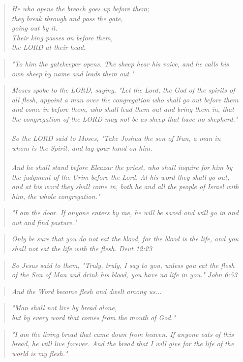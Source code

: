 \documentclass[10pt,oneside,footinclude=true,headinclude=true]{scrbook} %
\newcommand\quot[1]{
	\begin{quote}\textit{\small#1}\end{quote}
}
\begin{document}
\quot{He who opens the breach goes up before them;\\
\hspace*{5mm}they break through and pass the gate,\\
\hspace*{5mm}going out by it.\\
Their king passes on before them,\\
\hspace*{5mm}the LORD at their head.}

\quot{"To him the gatekeeper opens. The sheep hear his voice, and he calls his own sheep by name and leads them out."}

\quot{Moses spoke to the LORD, saying, "Let the Lord, the God of the spirits of all flesh, appoint a man over the congregation who shall go out before them and come in before them, who shall lead them out and bring them in, that the congregation of the LORD may not be as sheep that have no shepherd."\\
\\
So the LORD said to Moses, "Take Joshua the son of Nun, a man in whom is the Spirit, and lay your hand on him.\\
\\
And he shall stand before Eleazar the priest, who shall inquire for him by the judgment of the Urim before the Lord. At his word they shall go out, and at his word they shall come in, both he and all the people of Israel with him, the whole congregation."}

\quot{"I am the door. If anyone enters by me, he will be saved and will go in and out and find pasture."}

\quot{Only be sure that you do not eat the blood, for the blood is the life, and you shall not eat the life with the flesh. Deut 12:23}

\quot{So Jesus said to them, "Truly, truly, I say to you, unless you eat the flesh of the Son of Man and drink his blood, you have no life in you." John 6:53}

\quot{And the Word became flesh and dwelt among us...}

\quot{"Man shall not live by bread alone,\\
\hspace*{5mm}but by every word that comes from the mouth of God."}

\quot{"I am the living bread that came down from heaven. If anyone eats of this bread, he will live forever. And the bread that I will give for the life of the world is my flesh."}
\end{document}
